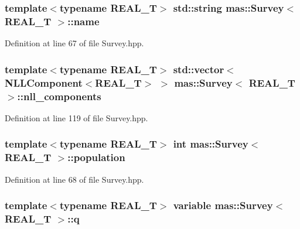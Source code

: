 \hypertarget{structmas_1_1_survey_a8fd8098e67c99e6dbd98ebad552693ee}{
\subsubsection[{name}]{\setlength{\rightskip}{0pt plus 5cm}template$<$typename R\-E\-A\-L\-\_\-\-T$>$ std\-::string {\bf mas\-::\-Survey}$<$ R\-E\-A\-L\-\_\-\-T $>$\-::name}}\label{structmas_1_1_survey_a8fd8098e67c99e6dbd98ebad552693ee}


Definition at line 67 of file Survey.\-hpp.

\hypertarget{structmas_1_1_survey_a329e35f53bdb96c93709981bba9cf5b6}{
\subsubsection[{nll\-\_\-components}]{\setlength{\rightskip}{0pt plus 5cm}template$<$typename R\-E\-A\-L\-\_\-\-T$>$ std\-::vector$<${\bf N\-L\-L\-Component}$<$R\-E\-A\-L\-\_\-\-T$>$ $>$ {\bf mas\-::\-Survey}$<$ R\-E\-A\-L\-\_\-\-T $>$\-::nll\-\_\-components}}\label{structmas_1_1_survey_a329e35f53bdb96c93709981bba9cf5b6}


Definition at line 119 of file Survey.\-hpp.

\hypertarget{structmas_1_1_survey_a6c064392c7b16513028547c473c612d4}{
\subsubsection[{population}]{\setlength{\rightskip}{0pt plus 5cm}template$<$typename R\-E\-A\-L\-\_\-\-T$>$ int {\bf mas\-::\-Survey}$<$ R\-E\-A\-L\-\_\-\-T $>$\-::population}}\label{structmas_1_1_survey_a6c064392c7b16513028547c473c612d4}


Definition at line 68 of file Survey.\-hpp.

\hypertarget{structmas_1_1_survey_a6c5894f588689dc14a54b218da5f6663}{
\subsubsection[{q}]{\setlength{\rightskip}{0pt plus 5cm}template$<$typename R\-E\-A\-L\-\_\-\-T$>$ {\bf variable} {\bf mas\-::\-Survey}$<$ R\-E\-A\-L\-\_\-\-T $>$\-::q}}\label{structmas_1_1_survey_a6c5894f588689dc14a54b218da5f6663}


